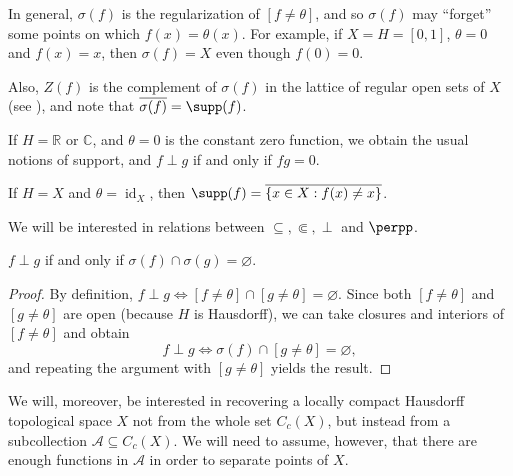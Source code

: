 \begin{remark}
In general, $\sigma(f)$ is the regularization of $[f\neq\theta]$, and so $\sigma(f)$ may ``forget'' some points on which $f(x)=\theta(x)$. For example, if $X=H=[0,1]$, $\theta=0$ and $f(x)=x$, then $\sigma(f)=X$ even though $f(0)=0$.

Also, $Z(f)$ is the complement of $\sigma(f)$ in the lattice of regular open sets of $X$ (see \cite[Chapter 10]{MR2466574}), and note that $\overline{\sigma(f)}=\supp(f)$.
\end{remark}

\begin{example}
If $H=\mathbb{R}$ or $\mathbb{C}$, and $\theta=0$ is the constant zero function, we obtain the usual notions of support, and $f\perp g$ if and only if $fg=0$.
\end{example}

\begin{example}
If $H=X$ and $\theta=\operatorname{id}_X$, then $\supp(f)=\overline{\left\{x\in X:f(x)\neq x\right\}}$.
\end{example}

We will be interested in relations between $\subseteq,\Subset,\perp$ and $\perpp$.

\begin{lemma}\label{lemmadisjointnessintermsofsigma}
$f\perp g$ if and only if $\sigma(f)\cap\sigma(g)=\varnothing$.
\end{lemma}
\begin{proof}
By definition, $f\perp g\iff[f\neq\theta]\cap[g\neq\theta]=\varnothing$. Since both $[f\neq\theta]$ and $[g\neq\theta]$ are open (because $H$ is Hausdorff), we can take closures and interiors of $[f\neq\theta]$ and obtain
\[f\perp g\iff\sigma(f)\cap[g\neq\theta]=\varnothing,\]
and repeating the argument with $[g\neq\theta]$ yields the result.\qedhere
\end{proof}

We will, moreover, be interested in recovering a locally compact Hausdorff topological space $X$ not from the whole set $C_c(X)$, but instead from a subcollection $\mathcal{A}\subseteq C_c(X)$. We will need to assume, however, that there are enough functions in $\mathcal{A}$ in order to separate points of $X$.

